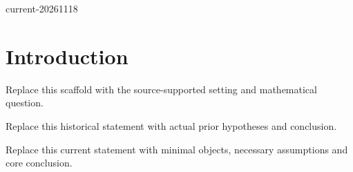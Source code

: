 \def\IntroExpectedRelease{current-20261118}

\ifdefined\IntroRelease
  \edef\IntroActualRelease{\IntroRelease}
  \ifx\IntroActualRelease\IntroExpectedRelease
  \else
    \PackageError{intro-v13}{Release mismatch}{Use the matching release.}
  \fi
\else
  \PackageError{intro-v13}{Missing profile release identity}{Use the matching release.}
\fi

\section{Introduction}
\begin{introparagraph}
Replace this scaffold with the source-supported setting and mathematical question.
\end{introparagraph}
\begin{historical}
Replace this historical statement with actual prior hypotheses and conclusion.
\end{historical}
\begin{resultgroup}
\begin{theorem}
Replace this current statement with minimal objects, necessary assumptions and core conclusion.
\end{theorem}
\end{resultgroup}
